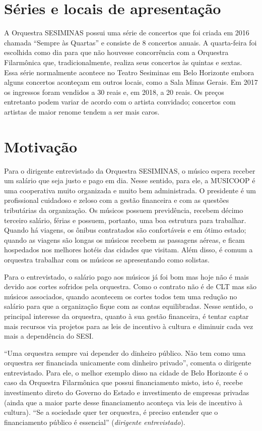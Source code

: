 \documentclass[a4paper, 12pt, openright, oneside, german, french, english, brazil]{abntex2}
\begin{document}
	\section{Séries e locais de apresentação}
	
	A Orquestra SESIMINAS possui uma série de concertos que foi criada em 2016 chamada ``Sempre às Quartas'' e consiste de 8 concertos anuais. A quarta-feira foi escolhida como dia para que não houvesse concorrência com a Orquestra Filarmônica que, tradicionalmente, realiza seus concertos às quintas e sextas. Essa série normalmente acontece no Teatro Sesiminas em Belo Horizonte embora alguns concertos aconteçam em outros locais, como a Sala Minas Gerais. Em 2017 os ingressos foram vendidos a 30 reais e, em 2018, a 20 reais. Os preços entretanto podem variar de acordo com o artista convidado; concertos com artistas de maior renome tendem a ser mais caros.
	
	\section{Motivação}
	
	Para o dirigente entrevistado da Orquestra SESIMINAS, o músico espera receber um salário que seja justo e pago em dia. Nesse sentido, para ele, a MUSICOOP é uma cooperativa muito organizada e muito bem administrada. O presidente é um profissional cuidadoso e zeloso com a gestão financeira e com as questões tributárias da organização. Os músicos possuem previdência, recebem décimo terceiro salário, férias e possuem, portanto, uma boa estrutura para trabalhar. Quando há viagens, os ônibus contratados são confortáveis e em ótimo estado; quando as viagens são longas os músicos recebem as passagens aéreas, e ficam hospedados nos melhores hotéis das cidades que visitam. Além disso, é comum a orquestra trabalhar com os músicos se apresentando como solistas.
	
	Para o entrevistado, o salário pago aos músicos já foi bom mas hoje não é mais devido aos cortes sofridos pela orquestra. Como o contrato não é de CLT mas são músicos associados, quando acontecem os cortes todos tem uma redução no salário para que a organização fique com as contas equilibradas. Nesse sentido, o principal interesse da orquestra, quanto à sua gestão financeira, é tentar captar mais recursos via projetos para as leis de incentivo à cultura e diminuir cada vez mais a dependência do SESI.
	
	``Uma orquestra sempre vai depender do dinheiro público. Não tem como uma orquestra ser financiada unicamente com dinheiro privado'', comenta o dirigente entrevistado. Para ele, o melhor exemplo disso na cidade de Belo Horizonte é o caso da Orquestra Filarmônica que possui financiamento misto, isto é, recebe investimento direto do Governo do Estado e investimento de empresas privadas (ainda que a maior parte desse financiamento aconteça via leis de incentivo à cultura). ``Se a sociedade quer ter orquestra, é preciso entender que o financiamento público é essencial'' (\textit{dirigente entrevistado}). 
	
\end{document}
